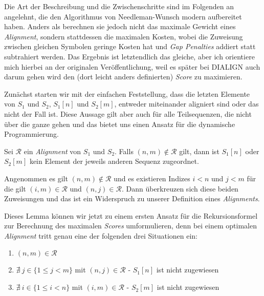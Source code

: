 Die Art der Beschreibung und die Zwischenschritte  sind im Folgenden an \cite{kt05} angelehnt, die den Algorithmus von Needleman-Wunsch modern aufbereitet haben. Anders als \cite{nw70} berechnen sie jedoch nicht das maximale Gewicht eines \emph{Alignment}, sondern stattdessen die maximalen Kosten, wobei die Zuweisung zwischen gleichen Symbolen geringe Kosten hat und \emph{Gap Penalties} addiert statt subtrahiert werden. Das Ergebnis ist letztendlich das gleiche, aber ich orientiere mich hierbei an der originalen Veröffentlichung, weil es später bei DIALIGN auch darum gehen wird den (dort leicht anders definierten) \emph{Score} zu maximieren.

Zunächst starten wir mit der einfachen Feststellung, dass die letzten Elemente von $S_1$ und $S_2$, $S_1[n]$ und $S_2[m]$, entweder miteinander aligniert sind oder das nicht der Fall ist. Diese Aussage gilt aber auch für alle Teilsequenzen, die nicht über die ganze gehen und das bietet uns einen Ansatz für die dynamische Programmierung. 

\begin{lemma}
	Sei $\mathcal{R}$ ein \emph{Alignment} von $S_1$ und $S_2$. Falls $(n,m) \notin \mathcal{R}$ gilt, dann ist $S_1[n]$ oder $S_2[m]$ kein Element der jeweils anderen Sequenz zugeordnet. 
\end{lemma}

\begin{beweis}
	Angenommen es gilt $(n,m) \notin \mathcal{R}$ und es existieren Indizes $i < n$ und $j < m$ für die gilt $(i,m) \in \mathcal{R}$ und $(n,j) \in \mathcal{R}$. Dann überkreuzen sich diese beiden Zuweisungen und das ist ein Widerspruch zu unserer Definition eines  \emph{Alignments}.
\end{beweis}

Dieses Lemma können wir jetzt zu einem ersten Ansatz für die Rekursionsformel zur Berechnung des maximalen \emph{Scores} umformulieren, denn bei einem optimalen \emph{Alignment} tritt genau eine der folgenden drei Situationen ein:

\begin{enumerate}[topsep=0pt,itemsep=-1ex,partopsep=1ex,parsep=1ex]
	\item $(n,m) \in \mathcal{R}$
	\item $\nexists\: j \in \{1 \leq j < m\}$ mit $(n,j) \in \mathcal{R}$ - $S_1[n]$ ist nicht zugewiesen
	\item $\nexists\: i \in \{1 \leq i < n\}$ mit $(i,m) \in \mathcal{R}$ - $S_2[m]$ ist nicht zugewiesen
\end{enumerate}

